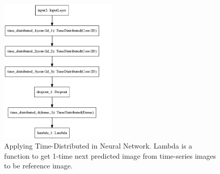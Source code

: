 \begin{figure}[]
	\centering
	\includegraphics[width=0.5\textwidth]{figures/timemodelPart1.png}
	\caption{Applying Time-Distributed in Neural Network. Lambda is a function to get 1-time next predicted image from time-series images to be reference image.}
	\label{fig:timemodelPart1}
\end{figure}

